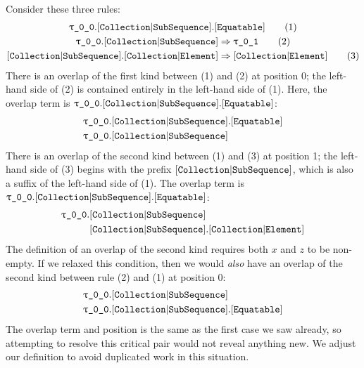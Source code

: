 \documentclass[../generics]{subfiles}
\begin{document}
\begin{example}
Consider these three rules:
\begin{gather*}
\ttgp{0}{0}.\assocsym{Collection}{SubSequence}.\protosym{Equatable}\tag{1}\\
\ttgp{0}{0}.\assocsym{Collection}{SubSequence}\Rightarrow\ttgp{0}{1}\tag{2}\\
\assocsym{Collection}{SubSequence}.\assocsym{Collection}{Element}\Rightarrow\assocsym{Collection}{Element}\tag{3}
\end{gather*}
There is an overlap of the first kind between (1) and (2) at position 0; the left-hand side of (2) is contained entirely in the left-hand side of (1). Here, the overlap term is $\texttt{$\uptau$\_0\_0}.[\texttt{Collection}|\texttt{SubSequence}].[\texttt{Equatable}]$:
\begin{align*}
&\texttt{$\uptau$\_0\_0}.[\texttt{Collection}|\texttt{SubSequence}].[\texttt{Equatable}]\\
&\texttt{$\uptau$\_0\_0}.[\texttt{Collection}|\texttt{SubSequence}]
\end{align*}
There is an overlap of the second kind between (1) and (3) at position 1; the left-hand side of (3) begins with the prefix $[\texttt{Collection}|\texttt{SubSequence}]$, which is also a suffix of the left-hand side of (1). The overlap term is $\texttt{$\uptau$\_0\_0}.[\texttt{Collection}|\texttt{SubSequence}].[\texttt{Equatable}]$:
\begin{align*}
\texttt{$\uptau$\_0\_0}.&[\texttt{Collection}|\texttt{SubSequence}]\\
&[\texttt{Collection}|\texttt{SubSequence}].[\texttt{Collection}|\texttt{Element}]
\end{align*}
The definition of an overlap of the second kind requires both $x$ and $z$ to be non-empty. If we relaxed this condition, then we would \emph{also} have an overlap of the second kind between rule (2) and (1) at position 0:
\begin{align*}
&\texttt{$\uptau$\_0\_0}.[\texttt{Collection}|\texttt{SubSequence}]\\
&\texttt{$\uptau$\_0\_0}.[\texttt{Collection}|\texttt{SubSequence}].[\texttt{Equatable}]
\end{align*}
The overlap term and position is the same as the first case we saw already, so attempting to resolve this critical pair would not reveal anything new. We adjust our definition to avoid duplicated work in this situation.


\end{example}
\end{document}
